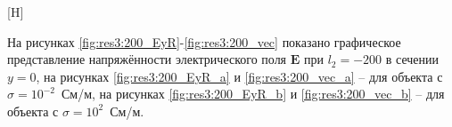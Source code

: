 \documentclass[a4paper,14pt]{article}
\makeatletter
\renewenvironment{figure}[1][\fps@figure]{
  \edef\@tempa{\noexpand\@float{figure}[#1]}
  \@tempa
  \addtocounter{foofigure}{1}
}{
  \end@float
}
\renewcommand{\Re}{\mathop{\mathrm{Re}}\nolimits}
\makeatother
\begin{document}
\begin{figure}[H]
	\centering
	\text{~~}
	\caption{$\Re(\mathbf{E}_z)$ при $l_2=-100$}
	\label{fig:res3:100_EzR}
\end{figure}

На рисунках \ref{fig:res3:200_EyR}-\ref{fig:res3:200_vec} показано графическое представление напряжённости электрического поля $\mathbf{E}$ при $l_2=-200$ в сечении $y=0$, на рисунках \ref{fig:res3:200_EyR_a} и \ref{fig:res3:200_vec_a} -- для объекта с $\sigma=10^{-2}$~См/м, на рисунках \ref{fig:res3:200_EyR_b} и \ref{fig:res3:200_vec_b} -- для объекта с $\sigma=10^{2}$~См/м.
\end{document}
